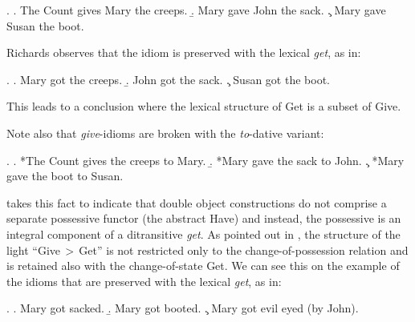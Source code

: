\ex. 
\a. The Count gives Mary the creeps.
\b. Mary gave John the sack.
\c. Mary gave Susan the boot.

Richards observes that the idiom is preserved with the lexical  \textit{get}, as in:

\ex. 
\a. Mary got the creeps.
\b. John got the sack.
\c. Susan got the boot.

This leads to a conclusion where the lexical structure of Get  is a subset of Give. 
\par 
Note also that \textit{give}-idioms are broken with the \textit{to}-dative variant:

\ex.
\a. *The Count gives the creeps to Mary.
\b. *Mary gave the sack to John.
\c. *Mary gave the boot to Susan.

\cite{Richards2001} takes this fact to indicate that double object constructions do not comprise a separate possessive functor (the abstract  Have) and instead, the possessive is an integral component of a ditransitive \textit{get}. As pointed out in \citet[\S4.2.3]{NU}, the  structure of the light ``Give\,$>$\,Get'' is not restricted only to the change-of-possession relation and is retained also with the change-of-state Get.  We can see this on the example of the idioms that are preserved with the lexical  \textit{get}, as in:

\ex.
\a. Mary got sacked.
\b. Mary got booted.
\c. Mary got evil eyed (by John).

